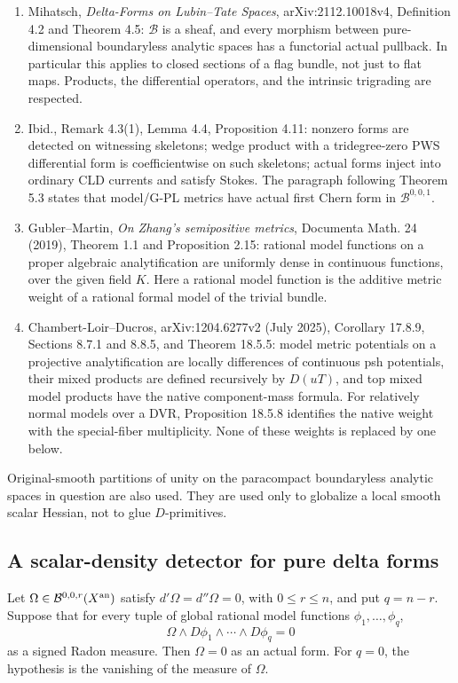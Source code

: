 \begin{enumerate}
\item Mihatsch, \emph{Delta-Forms on Lubin--Tate Spaces},
arXiv:2112.10018v4, Definition 4.2 and Theorem 4.5: $\mathcal B$ is
a sheaf, and every morphism between pure-dimensional boundaryless analytic
spaces has a functorial actual pullback.  In particular this applies to
closed sections of a flag bundle, not just to flat maps.  Products,
the differential operators, and the intrinsic trigrading are respected.
\item Ibid., Remark 4.3(1), Lemma 4.4, Proposition 4.11: nonzero forms
are detected on witnessing skeletons; wedge product with a tridegree-zero
PWS differential form is coefficientwise on such skeletons; actual
forms inject into ordinary CLD currents and satisfy Stokes.
The paragraph following Theorem 5.3 states that model/G-PL metrics
have actual first Chern form in $\mathcal B^{0,0,1}$.
\item Gubler--Martin, \emph{On Zhang's semipositive metrics},
Documenta Math. 24 (2019), Theorem 1.1 and Proposition 2.15:
rational model functions on a proper algebraic analytification are
uniformly dense in continuous functions, over the given field $K$.
Here a rational model function is the additive metric weight of a
rational formal model of the trivial bundle.
\item Chambert-Loir--Ducros, arXiv:1204.6277v2 (July 2025),
Corollary 17.8.9, Sections 8.7.1 and 8.8.5, and Theorem 18.5.5:
model metric potentials on a projective analytification are locally
differences of continuous psh potentials, their mixed products are
defined recursively by $D(uT)$, and top mixed model products have the
native component-mass formula.  For relatively normal models over a DVR,
Proposition 18.5.8 identifies the native weight with the special-fiber
multiplicity.  None of these weights is replaced by one below.
\end{enumerate}

Original-smooth partitions of unity on the paracompact boundaryless
analytic spaces in question are also used.  They are used only to
globalize a local smooth scalar Hessian, not to glue $D$-primitives.

\subsection{A scalar-density detector for pure delta forms}

\begin{lemma}
\label{r10c:detector}
Let $\Omega\in\mathcal B^{0,0,r}(X^{\rm an})$ satisfy
$d'\Omega=d''\Omega=0$, with $0\leq r\leq n$, and put $q=n-r$.  Suppose that for every
tuple of global rational model functions $\phi_1,\ldots,\phi_q$,
\[
                 \Omega\wedge D\phi_1\wedge\cdots\wedge D\phi_q=0
\]
as a signed Radon measure.  Then $\Omega=0$ as an actual form.
For $q=0$, the hypothesis is the vanishing of the measure of $\Omega$.
\end{lemma}

